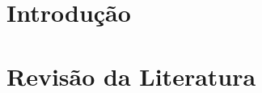 \documentclass[
    12pt,               %
    openright,          %
    oneside,
    a4paper,            %
    MODELO,             %
    english,            %
    brazil,              %
    pstricks,border=12pt
   ]{ifsp-spo-inf-ctds}
\begin{document}
    \imprimircapa

    \frenchspacing 
    
    \pretextual
    
    \imprimirfolhaderosto
    
    
    
    
    
    
    
    
    \listoffigures*
    \cleardoublepage
    
    \listoftables*
    \cleardoublepage
    
    \listofquadros*
    \cleardoublepage
    
    

    \tableofcontents*
    \cleardoublepage
    
    \textual
    
    \chapter{Introdução}
    
    
    
    
    
    \chapter{Revisão da Literatura}
    
\end{document}

